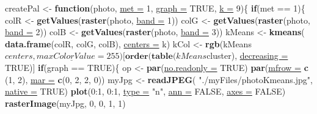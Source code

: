 \documentclass[twoside,symmetric]{book}
\newenvironment{Shaded}{}{}
\newcommand{\ControlFlowTok}[1]{\textbf{#1}}
\newcommand{\DataTypeTok}[1]{\underline{#1}}
\newcommand{\DecValTok}[1]{#1}
\newcommand{\KeywordTok}[1]{\textbf{#1}}
\newcommand{\NormalTok}[1]{#1}
\newcommand{\OperatorTok}[1]{#1}
\newcommand{\OtherTok}[1]{#1}
\newcommand{\StringTok}[1]{#1}
\begin{document}
\begin{Shaded}
\begin{Highlighting}[]
\NormalTok{createPal <-}\StringTok{ }\ControlFlowTok{function}\NormalTok{(photo, }\DataTypeTok{met =} \DecValTok{1}\NormalTok{, }\DataTypeTok{graph =} \OtherTok{TRUE}\NormalTok{, }\DataTypeTok{k =} \DecValTok{9}\NormalTok{)\{}
    \ControlFlowTok{if}\NormalTok{(met }\OperatorTok{==}\StringTok{ }\DecValTok{1}\NormalTok{)\{}
\NormalTok{        colR <-}\StringTok{ }\KeywordTok{getValues}\NormalTok{(}\KeywordTok{raster}\NormalTok{(photo, }\DataTypeTok{band =} \DecValTok{1}\NormalTok{))}
\NormalTok{        colG <-}\StringTok{ }\KeywordTok{getValues}\NormalTok{(}\KeywordTok{raster}\NormalTok{(photo, }\DataTypeTok{band =} \DecValTok{2}\NormalTok{))}
\NormalTok{        colB <-}\StringTok{ }\KeywordTok{getValues}\NormalTok{(}\KeywordTok{raster}\NormalTok{(photo, }\DataTypeTok{band =} \DecValTok{3}\NormalTok{))}
\NormalTok{        kMeans <-}\StringTok{ }\KeywordTok{kmeans}\NormalTok{(}
          \KeywordTok{data.frame}\NormalTok{(colR, colG, colB), }
          \DataTypeTok{centers =}\NormalTok{ k)}
\NormalTok{        kCol <-}\StringTok{ }\KeywordTok{rgb}\NormalTok{(kMeans}\OperatorTok{$}\NormalTok{centers, }\DataTypeTok{maxColorValue =} \DecValTok{255}\NormalTok{)[}
          \KeywordTok{order}\NormalTok{(}\KeywordTok{table}\NormalTok{(}
\NormalTok{              kMeans}\OperatorTok{$}\NormalTok{cluster), }\DataTypeTok{decreasing =} \OtherTok{TRUE}\NormalTok{)]}
        \ControlFlowTok{if}\NormalTok{(graph }\OperatorTok{==}\StringTok{ }\OtherTok{TRUE}\NormalTok{)\{}
\NormalTok{          op <-}\StringTok{ }\KeywordTok{par}\NormalTok{(}\DataTypeTok{no.readonly =} \OtherTok{TRUE}\NormalTok{)}
          \KeywordTok{par}\NormalTok{(}\DataTypeTok{mfrow =} \KeywordTok{c}\NormalTok{ (}\DecValTok{1}\NormalTok{, }\DecValTok{2}\NormalTok{), }\DataTypeTok{mar =} \KeywordTok{c}\NormalTok{(}\DecValTok{0}\NormalTok{, }\DecValTok{2}\NormalTok{, }\DecValTok{2}\NormalTok{, }\DecValTok{0}\NormalTok{))}
\NormalTok{          myJpg <-}\StringTok{ }\KeywordTok{readJPEG}\NormalTok{(}
            \StringTok{"./myFiles/photoKmeans.jpg"}\NormalTok{, }
            \DataTypeTok{native =} \OtherTok{TRUE}\NormalTok{)}
          \KeywordTok{plot}\NormalTok{(}\DecValTok{0}\OperatorTok{:}\DecValTok{1}\NormalTok{, }\DecValTok{0}\OperatorTok{:}\DecValTok{1}\NormalTok{, }\DataTypeTok{type =} \StringTok{"n"}\NormalTok{, }\DataTypeTok{ann =} \OtherTok{FALSE}\NormalTok{, }\DataTypeTok{axes =} \OtherTok{FALSE}\NormalTok{)}
          \KeywordTok{rasterImage}\NormalTok{(myJpg, }\DecValTok{0}\NormalTok{, }\DecValTok{0}\NormalTok{, }\DecValTok{1}\NormalTok{, }\DecValTok{1}\NormalTok{)}

\end{Highlighting}
\end{Shaded}
\end{document}
